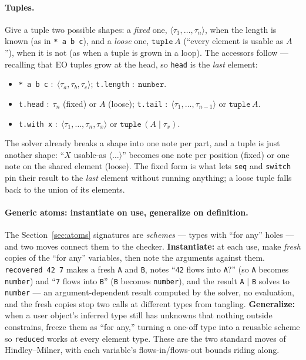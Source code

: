 \documentclass[10pt]{article}
\newcommand{\ty}[1]{\mathtt{#1}}     %
\begin{document}
\paragraph{Tuples.} Give a tuple two possible shapes: a \emph{fixed} one,
$\langle\tau_1,\dots,\tau_n\rangle$, when the length is known (as in
\verb|* a b c|), and a \emph{loose} one, $\ty{tuple}\,A$ (``every element is
usable as $A$''), when it is not (as when a tuple is grown in a loop). The
accessors follow --- recalling that EO tuples grow at the head, so \verb|head|
is the \emph{last} element:
\begin{itemize}\setlength{\itemsep}{0pt}\setlength{\parskip}{0pt}
\item \verb|* a b c| $:\;\langle\tau_a,\tau_b,\tau_c\rangle$; \quad
      \verb|t.length| $:\;\ty{number}$.
\item \verb|t.head| $:\;\tau_n$ (fixed) or $A$ (loose); \quad
      \verb|t.tail| $:\;\langle\tau_1,\dots,\tau_{n-1}\rangle$ or $\ty{tuple}\,A$.
\item \verb|t.with x| $:\;\langle\tau_1,\dots,\tau_n,\tau_x\rangle$ or
      $\ty{tuple}\,(A\mid\tau_x)$.
\end{itemize}
The solver already breaks a shape into one note per part, and a tuple is just
another shape: ``$X$ usable-as $\langle\dots\rangle$'' becomes one note per
position (fixed) or one note on the shared element (loose). The fixed form is
what lets \verb|seq| and \verb|switch| pin their result to the \emph{last}
element without running anything; a loose tuple falls back to the union of its
elements.

\paragraph{Generic atoms: instantiate on use, generalize on definition.} The
Section~\ref{sec:atoms} signatures are \emph{schemes} --- types with ``for any''
holes --- and two moves connect them to the checker. \textbf{Instantiate:} at
each use, make \emph{fresh} copies of the ``for any'' variables, then note the
arguments against them. \verb|recovered 42 7| makes a fresh \verb|A| and
\verb|B|, notes ``\verb|42| flows into \verb|A|?'' (so \verb|A| becomes
\verb|number|) and ``\verb|7| flows into \verb|B|'' (\verb|B| becomes
\verb|number|), and the result \verb|A| $\mid$ \verb|B| solves to \verb|number|
--- an argument-dependent result computed by the solver, no evaluation, and the
fresh copies stop two calls at different types from tangling. \textbf{Generalize:}
when a user object's inferred type still has unknowns that nothing outside
constrains, freeze them as ``for any,'' turning a one-off type into a reusable
scheme so \verb|reduced| works at every element type. These are the two standard
moves of Hindley--Milner, with each variable's flows-in/flows-out bounds riding
along.
\end{document}
